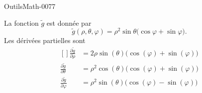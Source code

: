
\begin{corrige}{OutilsMath-0077}

    La fonction $\tilde g$ est donnée par
    \begin{equation}
        \tilde g(\rho,\theta,\varphi)=\rho^2\sin\theta\big( \cos\varphi+\sin\varphi \big).
    \end{equation}
    Les dérivées partielles sont
    \begin{equation}
        \begin{aligned}[]
            \frac{ \partial \tilde g }{ \partial \rho }&=2\rho\sin(\theta)\big( \cos(\varphi)+\sin(\varphi) \big)\\
            \frac{ \partial \tilde g }{ \partial \theta }&=\rho^2\cos(\theta)\big( \cos(\varphi)+\sin(\varphi) \big)\\
            \frac{ \partial \tilde g }{ \partial \varphi }&=\rho^2\sin(\theta)\big( \cos(\varphi)-\sin(\varphi) \big)
        \end{aligned}
    \end{equation}

\end{corrige}
